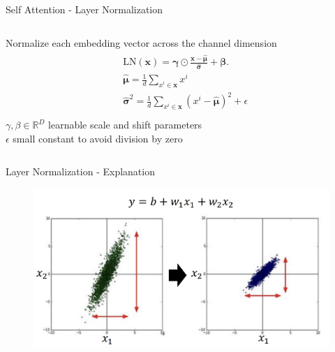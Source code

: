 \documentclass[aspectratio=169,xcolor=dvipsnames]{beamer}
\begin{document}
\begin{frame}{Self Attention - Layer Normalization}
\begin{columns}
        \begin{column}{0.6\textwidth}
        Normalize each embedding vector across the channel dimension
        \begin{align*}
            \begin{aligned}
            & \mathrm{LN}(\mathbf{x})=\boldsymbol{\gamma} \odot \frac{\mathbf{x}-\hat{\boldsymbol{\mu}}}{\hat{\boldsymbol{\sigma}}}+\boldsymbol{\beta} . \\
            & \hat{\boldsymbol{\mu}}=\frac{1}{d} \sum_{x^i \in \mathbf{x}} x^i \\
            & \hat{\boldsymbol{\sigma}}^2=\frac{1}{d} \sum_{x^i \in \mathbf{x}}\left(x^i-\hat{\boldsymbol{\mu}}\right)^2+\epsilon \\
            \end{aligned}
            \end{align*}
            $\gamma, \beta \in \mathbb{R}^D$ learnable scale and shift parameters \\
            $\epsilon$ small constant to avoid division by zero \\
        \end{column}
    \end{columns}
\end{frame}


\begin{frame}{Layer Normalization - Explanation}
    \begin{figure}
        \centering
        \includegraphics[width=0.8\linewidth]{figures/normalisation.png}
        \label{normalisation}
    \end{figure}
\end{frame}

\end{document}
